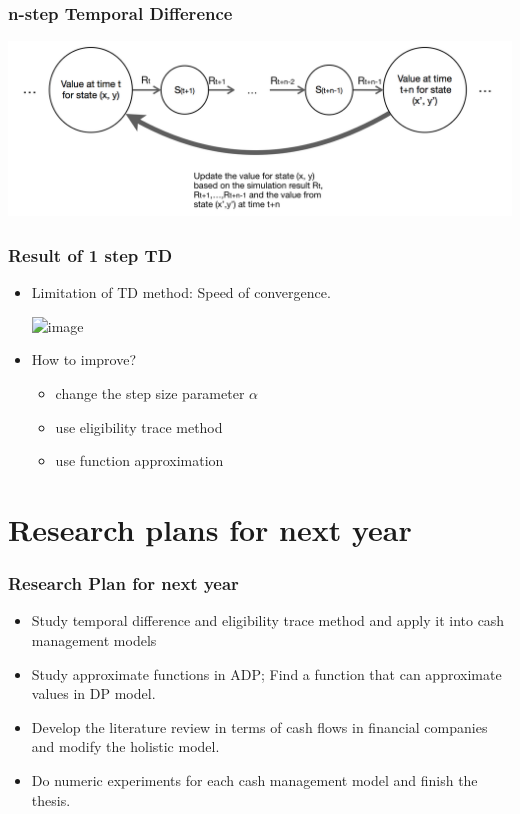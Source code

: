 \documentclass{beamer}
\begin{document}
\begin{frame}
\frametitle{n-step Temporal Difference}
\includegraphics[scale=.4]{nstep}
\end{frame}
\begin{frame}
\frametitle{Result of 1 step TD}
\begin{itemize}
\item Limitation of TD method: Speed of convergence.

\includegraphics<2>[scale=.34]{1TD}

\item<3-> How to improve?
\begin{itemize}
\item change the step size parameter $\alpha$
\item use eligibility trace method 
\item use function approximation

\end{itemize}

\end{itemize}
\end{frame}

\section{Research plans for next year}
\begin{frame}
\frametitle{Research Plan for next year}
\begin{itemize}
\item Study temporal difference and eligibility trace method and apply it into cash management models
\item Study approximate functions in ADP; Find a function that can approximate values in DP model.
\item Develop the literature review in terms of cash flows in financial companies and modify the holistic model.
\item Do numeric experiments for each cash management model and finish the thesis.
\end{itemize}
\end{frame}
\end{document}

